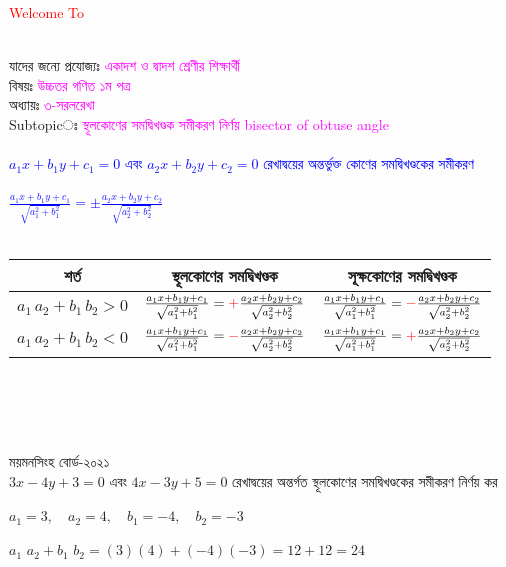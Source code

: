 \documentclass{article}
\begin{document}
 
	\Large
	\textcolor{red}{Welcome To} 
	\\
	\\
	যাদের জন্যে প্রযোজ্যঃ  	\textcolor{magenta}{একাদশ ও দ্বাদশ শ্রেণীর শিক্ষার্থী} \\
	বিষয়ঃ \textcolor{magenta}{উচ্চতর গণিত ১ম পত্র} \\
	অধ্যায়ঃ \textcolor{magenta}{৩-সরলরেখা}\\ 
	Subtopicঃ  \textcolor{magenta}{ স্থূলকোণের সমদ্বিখণ্ডক সমীকরণ নির্ণয় bisector of obtuse angle }\\
	\\
	\textcolor{blue}{$a_1x+b_1y+c_1=0$ এবং $a_2x+b_2y+c_2=0$ রেখাদ্বয়ের অন্তর্ভুক্ত কোণের সমদ্বিখণ্ডকের সমীকরণ \\
		\\
		 $\frac{a_1x+b_1y+c_1}{\sqrt{a_1^2+b_1^2}}=\pm \frac{a_2x+b_2y+c_2}{\sqrt{a_2^2+b_2^2}}$}\\
	\\
	\begin{tabular}{|c|c|c|}
		\hline 
	শর্ত	& স্থূলকোণের সমদ্বিখণ্ডক  & সূক্ষকোণের সমদ্বিখণ্ডক \\ 
		\hline  
$a_1\,a_2+b_1\,b_2>0$	& $\frac{a_1x+b_1y+c_1}{\sqrt{a_1^2+b_1^2}}=\textcolor{red}{+} \frac{a_2x+b_2y+c_2}{\sqrt{a_2^2+b_2^2}}$& $\frac{a_1x+b_1y+c_1}{\sqrt{a_1^2+b_1^2}}= \textcolor{red}{-} \frac{a_2x+b_2y+c_2}{\sqrt{a_2^2+b_2^2}}$\\
	\hline 
	$a_1\,a_2+b_1\,b_2<0$	& $\frac{a_1x+b_1y+c_1}{\sqrt{a_1^2+b_1^2}}=\textcolor{red}{-} \frac{a_2x+b_2y+c_2}{\sqrt{a_2^2+b_2^2}}$& $\frac{a_1x+b_1y+c_1}{\sqrt{a_1^2+b_1^2}}= \textcolor{red}{+} \frac{a_2x+b_2y+c_2}{\sqrt{a_2^2+b_2^2}}$\\
	\hline 
	\end{tabular}\\
\\ 
\\
\\
	ময়মনসিংহ   বোর্ড-২০২১\\ 
	$3x-4y+3=0$ এবং $4x-3y+5=0$ রেখাদ্বয়ের অন্তর্গত স্থূলকোণের সমদ্বিখণ্ডকের সমীকরণ নির্ণয় কর  \\
	\\
	$a_1=3,\quad a_2=4,\quad b_1=-4,\quad b_2=-3$\\
	\\
	$a_1\,\,a_2+b_1\,\,b_2=(3)(4)+(-4)(-3)=12+12=24$\\
\end{document}
